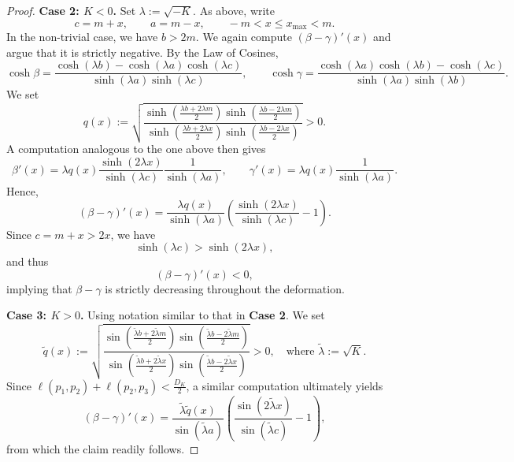 \documentclass[hidelinks,12pt,a4paper]{article}
\numberwithin{equation}{section}
\theoremstyle{plain}
\theoremstyle{definition}
\begin{document}
\begin{proof}
\medskip
\noindent
\textbf{Case 2: $K<0$.} Set $\lambda:=\sqrt{-K}$. As above, write
\begin{equation*}
c=m+x,\qquad a=m-x,\qquad -m<x\le x_{\max}<m.
\end{equation*}
In the non-trivial case, we have $b>2m$. We again compute $(\beta-\gamma)'(x)$ and argue that it is strictly negative. By the Law of Cosines,
\begin{equation*}
\cosh\beta = \frac{\cosh(\lambda b)-\cosh(\lambda a)\cosh(\lambda c)}
{\sinh(\lambda a)\sinh(\lambda c)}, 
\qquad
\cosh\gamma = \frac{\cosh(\lambda a)\cosh(\lambda b)-\cosh(\lambda c)}
{\sinh(\lambda a)\sinh(\lambda b)}.    
\end{equation*}
We set
\begin{equation*}
q(x):=\sqrt{\frac{\sinh\left(\frac{\lambda b+2\lambda m}{2}\right)\sinh\left(\frac{\lambda b-2\lambda m}{2}\right)}{\sinh\left(\frac{\lambda b+2\lambda x}{2}\right)\sinh\left(\frac{\lambda b-2\lambda x}{2}\right)}} > 0.
\end{equation*}
A computation analogous to the one above then gives
\begin{equation*}
\beta'(x)=\lambda q(x)
\frac{\sinh(2\lambda x)}
{\sinh(\lambda c)}\frac{1}{\sinh(\lambda a)},
\qquad
\gamma'(x) = \lambda q(x) \frac{1}{\sinh(\lambda a)}.
\end{equation*}
Hence,
\begin{equation*}
(\beta-\gamma)'(x)=\frac{\lambda q(x)}{\sinh(\lambda a)}\left(\frac{\sinh(2\lambda x)}{\sinh(\lambda c)}-1\right).
\end{equation*}
Since $c=m+x>2x$, we have
\begin{equation*}
\sinh(\lambda c)>\sinh(2\lambda x),
\end{equation*}
and thus
\begin{equation*}
(\beta-\gamma)'(x)<0,
\end{equation*}
implying that $\beta-\gamma$ is strictly decreasing throughout the deformation.

\medskip
\noindent
\textbf{Case 3: $K>0$.} Using notation similar to that in \textbf{Case 2}. We set
\begin{equation*}
\tilde{q}(x):=
\sqrt{\frac{\sin\left(\frac{\tilde{\lambda} b+2\tilde{\lambda} m}{2}\right)
\sin\left(\frac{\tilde{\lambda} b-2\tilde{\lambda} m}{2}\right)}{\sin\left(\frac{\tilde{\lambda} b+2\tilde{\lambda} x}{2}\right)
\sin\left(\frac{\tilde{\lambda} b-2\tilde{\lambda} x}{2}\right)}}>0,\quad \mathrm{where}\,\, \tilde{\lambda}:=\sqrt{K}.
\end{equation*}
Since $\ell(p_1,p_2) + \ell(p_2,p_3) < \frac{D_K}{2}$, a similar computation ultimately yields
\begin{equation}
\label{eq:K-positive-beta-gamma}
(\beta-\gamma)'(x)=
\frac{\tilde{\lambda} \tilde{q}(x)}{\sin(\tilde{\lambda} a)}
\left(\frac{\sin(2\tilde{\lambda} x)}{\sin(\tilde{\lambda} c)}-1 \right),
\end{equation}
from which the claim readily follows. 
\end{proof}
\end{document}
